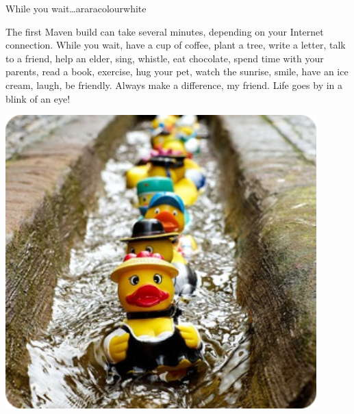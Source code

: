 \begin{messagebox}{While you wait\ldots}{araracolour}{\icok}{white}
\begin{minipage}{0.5\textwidth}
The first Maven build can take several minutes, depending on your Internet connection. While you wait, have a cup of coffee, plant a tree, write a letter, talk to a friend, help an elder, sing, whistle, eat chocolate, spend time with your parents, read a book, exercise, hug your pet, watch the sunrise, smile, have an ice cream, laugh, be friendly. Always make a difference, my friend. Life goes by in a blink of an eye!
\end{minipage}\hspace{1em}
\begin{minipage}{0.45\textwidth}
\vspace{.8em}
{\centering\includegraphics[width=0.9\textwidth]{figures/ducks.png}\par}
\vspace{.8em}
\end{minipage}
\end{messagebox}
